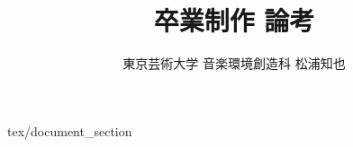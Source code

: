 \documentclass[twocolumn]{jsarticle}
\title {卒業制作 論考}
\author {東京芸術大学 音楽環境創造科 松浦知也}
\begin{document}
\maketitle
 {tex/document_section}
\end{document}
